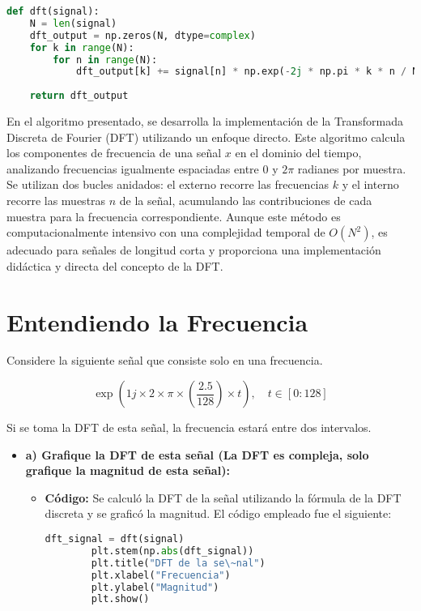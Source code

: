 \documentclass[conference,compsoc]{IEEEtran}
\begin{document}
\begin{lstlisting}[language=Python, basicstyle=\ttfamily\footnotesize, breaklines=true]
def dft(signal):
    N = len(signal)
    dft_output = np.zeros(N, dtype=complex)
    for k in range(N):
        for n in range(N):
            dft_output[k] += signal[n] * np.exp(-2j * np.pi * k * n / N)
            
    return dft_output
\end{lstlisting}
En el algoritmo presentado, se desarrolla la implementación de la Transformada Discreta de Fourier (DFT) utilizando un enfoque directo. Este algoritmo calcula los componentes de frecuencia de una señal \(x\) en el dominio del tiempo, analizando frecuencias igualmente espaciadas entre \(0\) y \(2\pi\) radianes por muestra. Se utilizan dos bucles anidados: el externo recorre las frecuencias \(k\) y el interno recorre las muestras \(n\) de la señal, acumulando las contribuciones de cada muestra para la frecuencia correspondiente. Aunque este método es computacionalmente intensivo con una complejidad temporal de \(O(N^2)\), es adecuado para señales de longitud corta y proporciona una implementación didáctica y directa del concepto de la DFT.

\section{Entendiendo la Frecuencia}

Considere la siguiente señal que consiste solo en una frecuencia.

\[
\exp(1j \times 2 \times \pi \times \left(\frac{2.5}{128}\right) \times t), \quad t \in [0 : 128]
\]

Si se toma la DFT de esta señal, la frecuencia estará entre dos intervalos.

\begin{itemize}
    \item \textbf{a) Grafique la DFT de esta señal (La DFT es compleja, solo grafique la magnitud de esta señal):}
    
    \begin{itemize}
        \item \textbf{Código:} Se calculó la DFT de la señal utilizando la fórmula de la DFT discreta y se graficó la magnitud. El código empleado fue el siguiente:
        
        \begin{lstlisting}[language=Python, basicstyle=\ttfamily\footnotesize, breaklines=true]
        dft_signal = dft(signal)
        plt.stem(np.abs(dft_signal))
        plt.title("DFT de la se\~nal")
        plt.xlabel("Frecuencia")
        plt.ylabel("Magnitud")
        plt.show()
        \end{lstlisting}
    \end{itemize}
\end{itemize}
\end{document}
